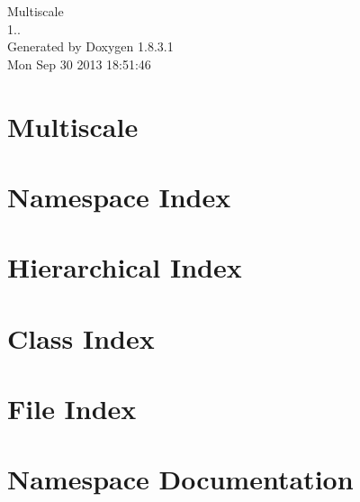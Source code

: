\documentclass{book}
\begin{document}
\hypersetup{pageanchor=false,citecolor=blue}
\begin{titlepage}
\vspace*{7cm}
\begin{center}
{\Large Multiscale \\[1ex]\large 1.. }\\
\vspace*{1cm}
{\large Generated by Doxygen 1.8.3.1}\\
\vspace*{0.5cm}
{\small Mon Sep 30 2013 18:51:46}\\
\end{center}
\end{titlepage}
\clearemptydoublepage
{}
\tableofcontents
\clearemptydoublepage
{}
\hypersetup{pageanchor=true,citecolor=blue}
\chapter{Multiscale}
\label{index}\hypertarget{index}{}
\chapter{Namespace Index}

\chapter{Hierarchical Index}

\chapter{Class Index}

\chapter{File Index}

\chapter{Namespace Documentation}



\end{document}

